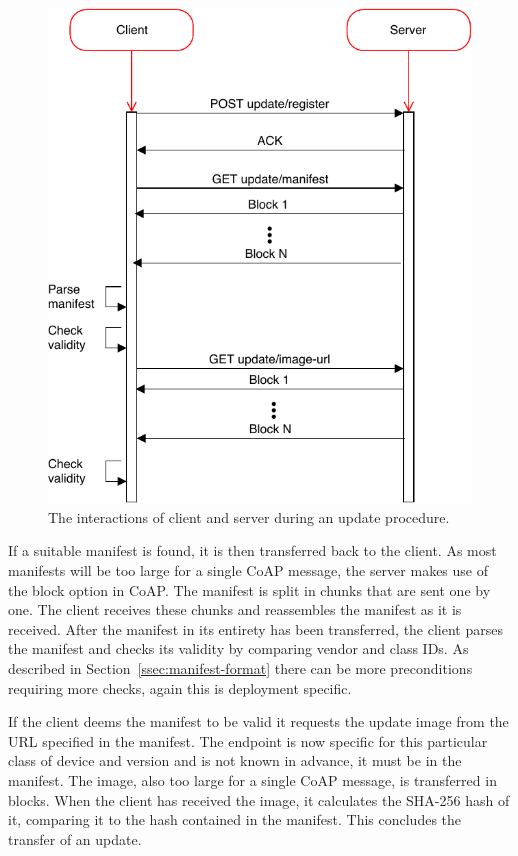 \documentclass[0-thesis.tex]{subfiles}
\begin{document}
\begin{figure}
    \caption{The interactions of client and server during an update procedure.}
    \label{fig:client-server-interaction}
    \includegraphics{images/client-server-sequence.pdf}
\end{figure}

If a suitable manifest is found, it is then transferred back to the client. As most
manifests will be too large for a single CoAP message, the server makes use of the block
option in CoAP. The manifest is split in chunks that are sent one by one. The client
receives these chunks and reassembles the manifest as it is received. After the manifest
in its entirety has been transferred, the client parses the manifest and checks its
validity by comparing vendor and class IDs. As described in
Section~\ref{ssec:manifest-format} there can be more preconditions requiring more checks,
again this is deployment specific. 

If the client deems the manifest to be valid it requests the update image from the URL
specified in the manifest. The endpoint is now specific for this particular class of
device and version and is not known in advance, it must be in the manifest. The image,
also too large for a single CoAP message, is transferred in blocks. When the client has
received the image, it calculates the SHA-256 hash of it, comparing it to the hash
contained in the manifest. This concludes the transfer of an update.
\end{document}

